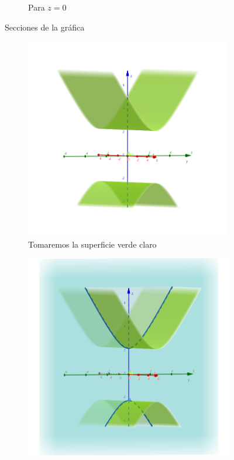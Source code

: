 \documentclass[letterpaper,11pt]{article}
\begin{document}
\begin{enumerate}
\begin{figure}[h!]
\begin{subfigure}{0.3\textwidth}
		\caption{Para $ z = 0 $}
	\end{subfigure}
	\caption{Secciones de la gráfica }
\end{figure}
\begin{figure}[h!]
	\centering
	\begin{subfigure}{.7\textwidth}
		\centering
		\includegraphics[width=9cm]{img/2e1}
		\caption{Tomaremos la superficie verde claro }
		\label{F1_1}
	\end{subfigure}
	\begin{subfigure}{0.3\textwidth}
		\includegraphics[width=\linewidth]{img/2e2_1}

\end{subfigure}
\end{figure}
\end{enumerate}
\end{document}
